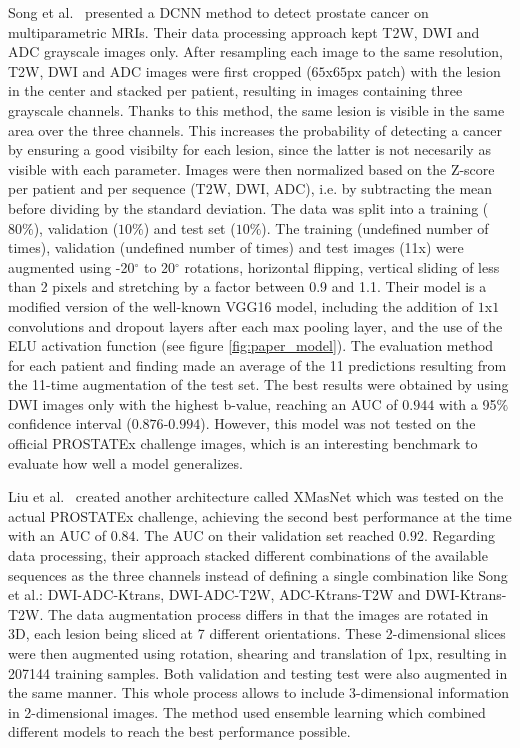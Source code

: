 Song et al.~\cite{07} presented a DCNN method to detect prostate cancer on multiparametric MRIs. Their data processing approach kept T2W, DWI and ADC grayscale images only. After resampling each image to the same resolution, T2W, DWI and ADC images were first cropped ($65$x$65$px patch) with the lesion in the center and stacked per patient, resulting in images containing three grayscale channels. Thanks to this method, the same lesion is visible in the same area over the three channels. This increases the probability of detecting a cancer by ensuring a good visibilty for each lesion, since the latter is not necesarily as visible with each parameter. Images were then normalized based on the Z-score per patient and per sequence (T2W, DWI, ADC), i.e. by subtracting the mean before dividing by the standard deviation. The data was split into a training ($80\%$), validation ($10\%$) and test set ($10\%$). The training (undefined number of times), validation (undefined number of times) and test images (11x) were augmented using -20$^\circ$ to 20$^\circ$ rotations, horizontal flipping, vertical sliding of less than 2 pixels and stretching by a factor between 0.9 and 1.1.
Their model is a modified version of the well-known VGG16 model, including the addition of $1$x$1$ convolutions and dropout layers after each max pooling layer, and the use of the ELU activation function (see figure \ref{fig:paper_model}). The evaluation method for each patient and finding made an average of the 11 predictions resulting from the 11-time augmentation of the test set. The best results were obtained by using DWI images only with the highest b-value, reaching an AUC of $0.944$ with a 95$\%$ confidence interval ($0.876$-$0.994$). However, this model was not tested on the official PROSTATEx challenge images, which is an interesting benchmark to evaluate how well a model generalizes.

Liu et al.~\cite{46} created another architecture called XMasNet which was tested on the actual PROSTATEx challenge, achieving the second best performance at the time with an AUC of $0.84$. The AUC on their validation set reached $0.92$. Regarding data processing, their approach stacked different combinations of the available sequences as the three channels instead of defining a single combination like Song et al.: DWI-ADC-Ktrans, DWI-ADC-T2W, ADC-Ktrans-T2W and DWI-Ktrans-T2W. The data augmentation process differs in that the images are rotated in 3D, each lesion being sliced at 7 different orientations. These 2-dimensional slices were then augmented using rotation, shearing and translation of 1px, resulting in 207144 training samples. Both validation and testing test were also augmented in the same manner. This whole process allows to include 3-dimensional information in 2-dimensional images. The method used ensemble learning which combined different models to reach the best performance possible.

